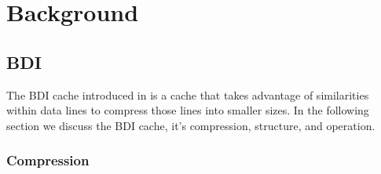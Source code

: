 
\chapter{Background}
\label{ch:Background}


\section{BDI}
\label{sec:BDI}
The BDI cache introduced in \cite{bdi} is a cache that takes advantage of similarities within data lines to compress those lines into smaller sizes. In the following section we discuss the BDI cache, it's compression, structure, and operation.
\subsection{Compression}
\label{Compression}
